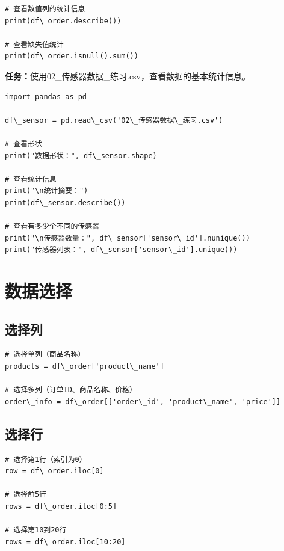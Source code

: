 \documentclass[12pt,a4paper]{article}
\begin{document}
\begin{lstlisting}[caption={使用describe()查看统计信息}]
# 查看数值列的统计信息
print(df\_order.describe())

# 查看缺失值统计
print(df\_order.isnull().sum())
\end{lstlisting}

\begin{practicebox}
\textbf{任务：}使用02\_传感器数据\_练习.csv，查看数据的基本统计信息。

\begin{lstlisting}
import pandas as pd

df\_sensor = pd.read\_csv('02\_传感器数据\_练习.csv')

# 查看形状
print("数据形状：", df\_sensor.shape)

# 查看统计信息
print("\n统计摘要：")
print(df\_sensor.describe())

# 查看有多少个不同的传感器
print("\n传感器数量：", df\_sensor['sensor\_id'].nunique())
print("传感器列表：", df\_sensor['sensor\_id'].unique())
\end{lstlisting}
\end{practicebox}

\section{数据选择}

\subsection{选择列}

\begin{lstlisting}[caption={选择单列和多列}]
# 选择单列（商品名称）
products = df\_order['product\_name']

# 选择多列（订单ID、商品名称、价格）
order\_info = df\_order[['order\_id', 'product\_name', 'price']]
\end{lstlisting}

\subsection{选择行}

\begin{lstlisting}[caption={使用iloc选择行}]
# 选择第1行（索引为0）
row = df\_order.iloc[0]

# 选择前5行
rows = df\_order.iloc[0:5]

# 选择第10到20行
rows = df\_order.iloc[10:20]
\end{lstlisting}
\end{document}
